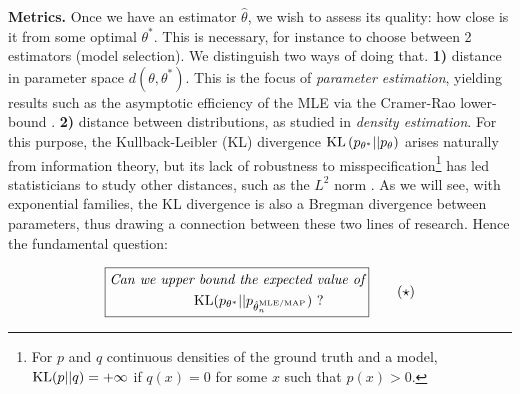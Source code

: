 \documentclass[twoside]{article}
\newcommand{\nat}{\theta}
\begin{document}
{\bf Metrics.}
Once we have an estimator $\hat \nat$, we wish to assess its quality:
how close is it from some optimal $\nat^*$.
This is necessary, for instance to choose between 2 estimators (model selection).
We distinguish two ways of doing that.
{\bf 1)} distance in parameter space $d(\nat,\nat^*)$. This is the focus of \emph{parameter estimation}, yielding results such as the asymptotic efficiency of the MLE via the Cramer-Rao lower-bound \citep{aitken1942estimation}.
{\bf 2)} distance between distributions, as studied in \emph{density estimation}.
For this purpose, the Kullback-Leibler (KL) divergence $\KL\paren{p_{\nat^*} || p_{\nat} }$  arises naturally from information theory,
but its lack of robustness to misspecification\footnote{For $p$ and $q$ continuous densities of the ground truth and a model,
$\mathrm{KL}(p||q) = +\infty$ if $q(x)=0$ for some $x$ such that $p(x)>0$.
}
has led statisticians to study other distances, such as the $L^2$ norm \citep[e.g. \S1.2]{tsybakov2009introduction}.
As we will see, with exponential families, the KL divergence is also a Bregman divergence between parameters, thus drawing a connection between these two lines of research.
Hence the fundamental question:

\begin{equation}
\boxed{
\begin{aligned}
	\textit{Can we upper}&\textit{ bound  the expected value of} \\
	&\KL(p_{\nat^*} || p_{\hat \nat_n^\text{MLE/MAP} }) \ ?
\end{aligned}
}
\tag{$\star$}
\label{problem}
\end{equation}
\end{document}
